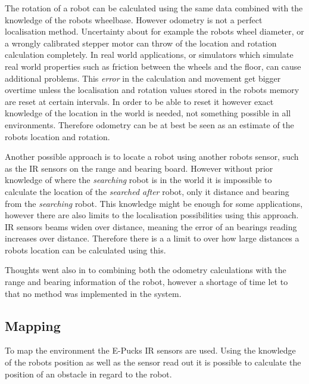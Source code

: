 The rotation of a robot can be calculated using the same data combined with the knowledge of the robots wheelbase.
However odometry is not a perfect localisation method. Uncertainty about for example the robots wheel diameter, or a wrongly calibrated stepper motor can throw of the location and rotation calculation completely. In real world applications, or simulators which simulate real world properties such as friction between the wheels and the floor, can cause additional problems. 
This \textit{error} in the calculation and movement get bigger overtime unless the localisation and rotation values stored in the robots memory are reset at certain intervals. In order to be able to reset it however exact knowledge of the location in the world is needed, not something possible in all environments.
Therefore odometry can be at best be seen as an estimate of the robots location and rotation. 

Another possible approach is to locate a robot using another robots sensor, such as the IR sensors on the range and bearing board. 
However without prior knowledge of where the \textit{searching} robot is in the world it is impossible to calculate the location of the \textit{searched after} robot, only it distance and bearing from the \textit{searching} robot. 
This knowledge might be enough for some applications, however there are also limits to the localisation possibilities using this approach.
IR sensors beams widen over distance, meaning the error of an bearings reading increases over distance. Therefore there is a a limit to over how large distances a robots location can be calculated using this. 

Thoughts went also in to combining both the odometry calculations with the range and bearing information of the robot, however a shortage of time let to that no method was implemented in the system. 


\subsection{Mapping}
To map the environment the E-Pucks IR sensors are used. 
Using the knowledge of the robots position as well as the sensor read out it is possible to calculate the position of an obstacle in regard to the robot. \\

